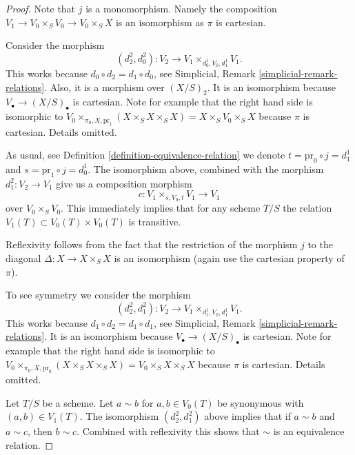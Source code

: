 \begin{proof}
Note that $j$ is a monomorphism. Namely the
composition $V_1 \to V_0 \times_S V_0 \to V_0 \times_S X$
is an isomorphism as $\pi$ is cartesian.

\medskip\noindent
Consider the morphism
$$
(d^2_2, d^2_0) : V_2 \to V_1 \times_{d^1_0, V_0, d^1_1} V_1.
$$
This works because $d_0 \circ d_2 = d_1 \circ d_0$,
see Simplicial, Remark \ref{simplicial-remark-relations}.
Also, it is a morphism over $(X/S)_2$. It is an isomorphism
because $V_\bullet \to (X/S)_\bullet$ is cartesian.
Note for example that the
right hand side is isomorphic to
$V_0 \times_{\pi_0, X, \text{pr}_1} (X \times_S X \times_S X) =
X \times_S V_0 \times_S X$
because $\pi$ is cartesian. Details omitted.

\medskip\noindent
As usual, see Definition \ref{definition-equivalence-relation}
we denote $t = \text{pr}_0 \circ j = d^1_1$ and
$s = \text{pr}_1 \circ j = d^1_0$.
The isomorphism above, combined with the morphism
$d^2_1 : V_2 \to V_1$ give us a composition morphism
$$
c : V_1 \times_{s, V_0, t} V_1 \longrightarrow V_1
$$
over $V_0 \times_S V_0$. This immediately implies
that for any scheme $T/S$ the relation
$V_1(T) \subset V_0(T) \times V_0(T)$ is transitive.

\medskip\noindent
Reflexivity follows from the fact that the
restriction of the morphism $j$ to the diagonal
$\Delta : X \to X\times_S X$ is an isomorphism
(again use the cartesian property of $\pi$).

\medskip\noindent
To see symmetry we consider the morphism
$$
(d^2_2, d^2_1) : V_2 \to V_1 \times_{d^1_1, V_0, d^1_1} V_1.
$$
This works because $d_1 \circ d_2 = d_1 \circ d_1$,
see Simplicial, Remark \ref{simplicial-remark-relations}.
It is an isomorphism
because $V_\bullet \to (X/S)_\bullet$ is cartesian.
Note for example that the
right hand side is isomorphic to
$V_0 \times_{\pi_0, X, \text{pr}_0} (X \times_S X \times_S X) =
V_0 \times_S X \times_S X$
because $\pi$ is cartesian. Details omitted.

\medskip\noindent
Let $T/S$ be a scheme. Let $a \sim b$ for $a, b \in V_0(T)$
be synonymous with $(a, b) \in V_1(T)$.
The isomorphism $(d^2_2, d^2_1)$ above
implies that if $a \sim b$ and $a \sim c$, then $b \sim c$.
Combined with reflexivity this shows that $\sim$ is
an equivalence relation.
\end{proof}







